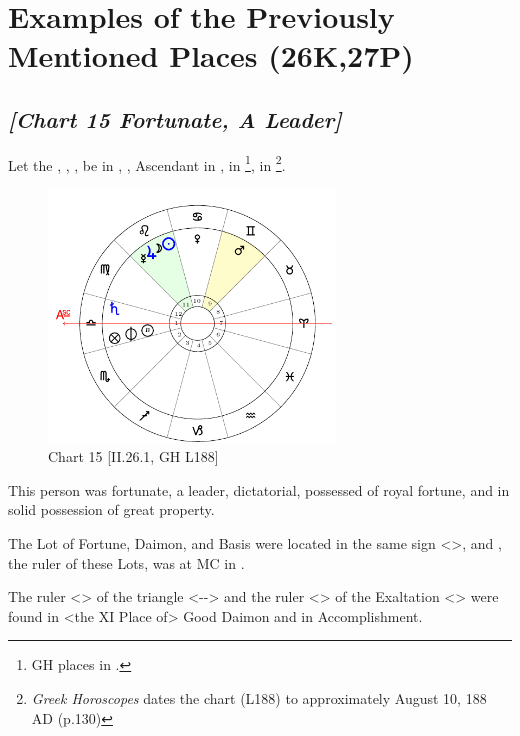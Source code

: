 \section{Examples of the Previously Mentioned Places (26K,27P)}

\subsection*{\textit{[Chart 15 Fortunate, A Leader]}}

Let the \Sun, \Moon, \Jupiter, \Mercury\xspace be in \Leo, \Saturn, Ascendant in \Libra, \Mars\xspace in \Gemini \footnote{GH places \Mars\xspace in \Aquarius.}, \Venus\xspace in \Cancer
\footnote{\textit{Greek Horoscopes} dates the chart (L188) to approximately August 10, 188 AD (p.130)}.

\clearpage
\begin{figure}
\centering
\includegraphics[width=0.68\textwidth]{charts/2_26_1}
\caption{Chart 15 [II.26.1, GH L188]}
\label{fig:chart15}
\end{figure}

This person was fortunate, a leader, dictatorial, possessed of royal fortune, and in solid possession of great property. 

The Lot of Fortune, Daimon, and Basis were located in the same sign <\Libra>, and \Venus, the ruler of these Lots, was at MC in \Cancer. 

The ruler <\Jupiter> of the triangle <\Leo-\Aries-\Sagittarius> and the ruler <\Mercury> of the Exaltation <\Gemini> were found in <the XI Place of> Good Daimon and in Accomplishment.

